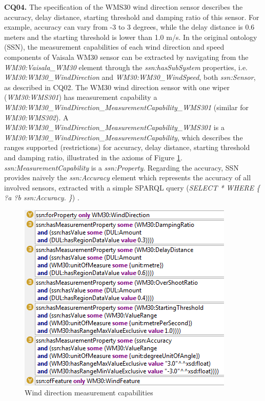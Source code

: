 \documentclass{sig-alternate-05-2015}
\begin{document}
\noindent
\textbf{CQ04.} The specification of the WMS30 wind direction sensor describes the accuracy, delay distance, starting threshold and damping ratio of this sensor. For example, accuracy can vary from -3 to 3 degrees, while the delay distance is 0.6 meters and the starting threshold is lower than 1.0 m/s.  
In the original ontology (SSN), the measurement capabilities of each wind direction and speed components  of Vaisala WM30 sensor can be extracted by navigating from the \textit{WM30:\-Vaisala\-\_WM30} element through the \textit{ssn:\-hasSubSystem} properties, i.e. \textit{WM30:\-WM30\-\_Wind\-Direction} and \textit{WM30:\-WM30\-\_WindSpeed}, both \textit{ssn:\-Sensor}, as described in CQ02. The WM30 wind direction sensor with one wiper (\textit{WM30:\-WMS301}) has measurement capability a  \textit{WM30:\-WM30\-\_Wind\-Direction\-\_MeasurementCapability\-\_WMS301} (similar for \textit{WM30:\-WMS302}). A \textit{WM30:\-WM30\-\_Wind\-Direction\-\_MeasurementCapability\-\_WMS301} is a \textit{WM30:\-WM30\-\_Wind\-Direction\-\_MeasurementCapability}, which describes the ranges supported (restrictions) for accuracy, delay distance, starting threshold and damping ratio, illustrated in the axioms of Figure \ref{fig:SSN_MeasurementCapability}. \textit{ssn:\-MeasurementCapability} is a \textit{ssn:\-Property}.
Regarding the accuracy, SSN provides naively the \textit{ssn:\-Accuracy} element which represents the accuracy of all involved sensors, extracted with a simple SPARQL query (\textit{SELECT * WHERE \{ ?a ?b ssn:\-Accuracy. \}}) .  
\begin{figure}[h!]
\centering
\includegraphics[scale=0.87]{SSN_MeasurementCapability}
\caption{Wind direction measurement capabilities} 
\label{fig:SSN_MeasurementCapability}
\end{figure}
\end{document}
